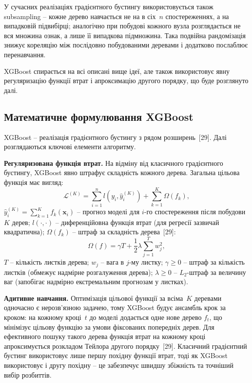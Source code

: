 \documentclass{bachelor_thesis}
\begin{document}
У сучасних реалізаціях градієнтного бустингу використовується також subsampling -- кожне дерево навчається не на в сіх~$n$ спостереженнях, а на випадковій підвибірці; аналогічно при побудові кожного вузла розглядається не вся множина ознак, а лише її випадкова підмножина. Така подвійна рандомізація знижує кореляцію між послідовно побудованими деревами і додатково послаблює перенавчання.

XGBoost спирається на всі описані вище ідеї, але також використовує явну регуляризацію функції втрат і апроксимацію другого порядку, що буде розглянуто далі.

\subsection{Математичне формулювання XGBoost}

XGBoost -- реалізація градієнтного бустингу з рядом розширень~[29]. Далі розглядаються ключові елементи алгоритму.

\textbf{Регуляризована функція втрат.} На відміну від класичного градієнтного бустингу, XGBoost явно штрафує складність кожного дерева. Загальна цільова функція має вигляд:
\begin{equation*}
\mathcal{L}^{(K)} = \sum_{i=1}^{n} l(y_i, \hat{y}_i^{(K)}) + \sum_{k=1}^{K} \Omega(f_k),
\end{equation*}
 $\hat{y}_i^{(K)} = \sum_{k=1}^{K} f_k(\mathbf{x}_i)$ -- прогноз моделі для $i$-го спостереження після побудови~$K$ дерев; $l(\cdot, \cdot)$ -- диференційовна функція втрат (для регресії зазвичай квадратична); $\Omega(f_k)$ -- штраф за складність дерева~[29]:
\begin{equation*}
\Omega(f) = \gamma T + \frac{1}{2} \lambda \sum_{j=1}^{T} w_j^2,
\end{equation*}
 $T$ -- кількість листків дерева; $w_j$ -- вага в $j$-му листку; $\gamma \geq 0$ -- штраф за кількість листків (обмежує надмірне розгалуження дерева); $\lambda \geq 0$ -- $L_2$-штраф за величину ваг (запобігає надмірно екстремальним прогнозам у листках).

\textbf{Адитивне навчання.} Оптимізація цільової функції за всіма~$K$ деревами одночасно є нерозв'язною задачею, тому XGBoost будує ансамбль крок за кроком: на кожному кроці~$t$ до моделі додається одне нове дерево $f_t$, що мінімізує цільову функцію за умови фіксованих попередніх дерев. Для ефективного пошуку такого дерева функція втрат на кожному кроці апроксимується розкладом Тейлора другого порядку~[29]. Класичний градієнтний бустинг використовує лише першу похідну функції втрат, тоді як XGBoost використовує і другу похідну -- це забезпечує швидшу збіжність та точніший вибір розбиттів.
\end{document}

